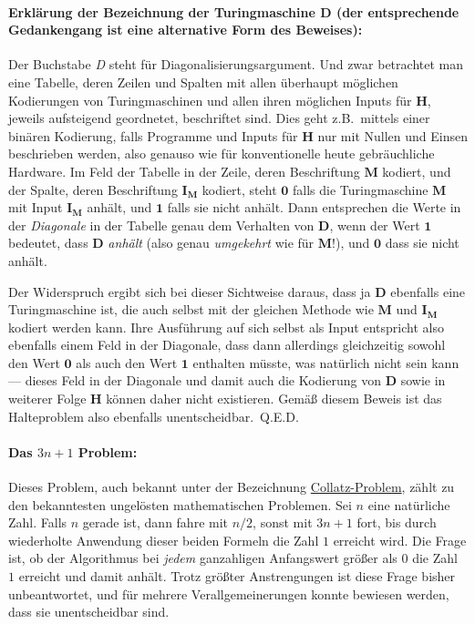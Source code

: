 \paragraph{Erklärung der Bezeichnung der Turingmaschine $\mathbf{D}$ (der entsprechende Gedankengang ist eine alternative Form des Beweises):} Der Buchstabe \emph{D} steht für Diagonalisierungsargument. Und zwar betrachtet man eine Tabelle, deren Zeilen und Spalten mit allen überhaupt möglichen Kodierungen von Turingmaschinen und allen ihren möglichen Inputs für $\mathbf{H}$, je\-weils aufsteigend geordnetet, beschriftet sind. Dies geht z.B.\ mittels einer binären Kodierung, falls Programme und Inputs für $\mathbf{H}$ nur mit Nullen und Einsen beschrieben werden, also genauso wie für konventionelle heute gebräuchliche Hardware. Im Feld der Tabelle in der Zeile, deren Beschriftung $\mathbf{M}$ kodiert, und der Spalte, deren Beschriftung $\mathbf{I_M}$ kodiert, steht $\mathbf{0}$ falls die Turingmaschine $\mathbf{M}$ mit Input $\mathbf{I_M}$ anhält, und $\mathbf{1}$ falls sie nicht anhält. Dann entsprechen die Werte in der \emph{Diagonale} in der Tabelle genau dem Verhalten von $\mathbf{D}$, wenn der Wert $\mathbf{1}$ bedeutet, dass $\mathbf{D}$ \emph{anhält} (also genau \emph{umgekehrt} wie für $\mathbf{M}$!), und $\mathbf{0}$ dass sie nicht anhält. 

Der Widerspruch ergibt sich bei dieser Sichtweise daraus, dass ja $\mathbf{D}$ ebenfalls eine Tu\-ringmaschine ist, die auch selbst mit der gleichen Methode wie $\mathbf{M}$ und $\mathbf{I_M}$ kodiert werden kann. Ihre Ausführung auf sich selbst als Input entspricht also ebenfalls einem Feld in der Diagonale, dass dann allerdings gleichzeitig sowohl den Wert $\mathbf{0}$ als auch den Wert $\mathbf{1}$ enthalten müsste, was natürlich nicht sein kann --- dieses Feld in der Diagonale und damit auch die Kodierung von $\mathbf{D}$ sowie in weiterer Folge $\mathbf{H}$ können daher nicht existieren. Gemäß diesem Beweis ist das Halteproblem also ebenfalls unentscheidbar.~Q.E.D.

\paragraph{Das $3n+1$ Problem:} Dieses Problem, auch bekannt unter der Bezeichnung \href{http://de.wikipedia.org/wiki/Collatz-Problem}{Collatz-Problem}, zählt zu den bekanntesten ungelösten mathematischen Problemen. Sei $n$ eine natürliche Zahl. Falls $n$ gerade ist, dann fahre mit $n/2$, sonst mit $3n+1$ fort, bis durch wiederholte Anwendung dieser beiden Formeln die Zahl $1$ erreicht wird. Die Frage ist, ob der Algorithmus bei \emph{jedem} ganzahligen Anfangswert größer als $0$ die Zahl $1$ erreicht und damit anhält. Trotz größter Anstrengungen ist diese Frage bisher unbeantwortet, und für mehrere Verallgemeinerungen konnte bewiesen werden, dass sie unentscheidbar sind. 

